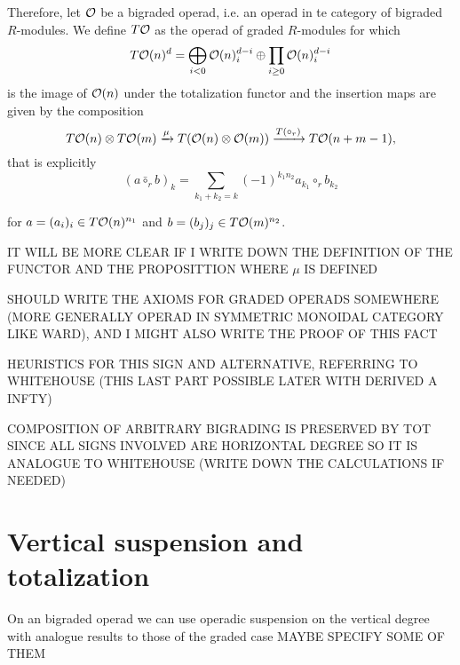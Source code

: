 \documentclass[twoside]{article}
\begin{document}
Therefore, let ${\mathcal O}$ be a bigraded operad, i.e. an operad in te category  of bigraded $R$-modules. We define $T{\mathcal O}$ as the operad of graded $R$-modules for which \[T{\mathcal O}(n)^d=\bigoplus_{i<0}{\mathcal O}(n)^{d-i}_i\oplus\prod_{i\geq 0} {\mathcal O}(n)^{d-i}_i\] is the image of ${\mathcal O}(n)$ under the totalization functor and the insertion maps are given by the composition  %
\[T{\mathcal O}(n)\otimes T{\mathcal O}(m)\xrightarrow{\mu} T({\mathcal O}(n)\otimes {\mathcal O}(m)) \xrightarrow{T(\circ_r)} T{\mathcal O}(n+m-1),\]
that is explicitly 
\[(a\bar{\circ}_rb)_k=\sum_{k_1+k_2=k} (-1)^{k_1n_2} a_{k_1}\circ_r b_{k_2}\]

for $a=(a_i)_i\in T{\mathcal O}(n)^{n_1}$ and $b=(b_j)_j\in T{\mathcal O}(m)^{n_2}$.

IT WILL BE MORE CLEAR IF I WRITE DOWN THE DEFINITION OF THE FUNCTOR AND THE PROPOSITTION WHERE $\mu$ IS DEFINED



SHOULD WRITE THE AXIOMS FOR GRADED OPERADS SOMEWHERE (MORE GENERALLY OPERAD IN SYMMETRIC MONOIDAL CATEGORY LIKE WARD), AND I MIGHT ALSO WRITE THE PROOF OF THIS FACT

HEURISTICS FOR THIS SIGN AND ALTERNATIVE, REFERRING TO WHITEHOUSE (THIS  LAST PART POSSIBLE LATER WITH DERIVED A INFTY)


COMPOSITION OF ARBITRARY BIGRADING IS PRESERVED BY TOT SINCE ALL SIGNS INVOLVED ARE HORIZONTAL DEGREE SO IT IS ANALOGUE TO WHITEHOUSE (WRITE DOWN THE CALCULATIONS IF NEEDED)

\section{Vertical suspension and totalization}
On an bigraded operad we can use operadic suspension on the vertical degree with analogue results to those of the graded case MAYBE SPECIFY SOME OF THEM

\end{document}
